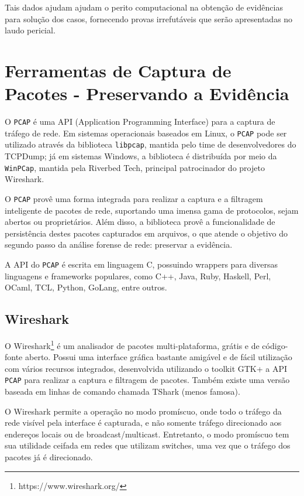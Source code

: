 \documentclass[12pt]{article}
\begin{document}
Tais dados ajudam ajudam o perito computacional na obtenção de evidências para solução dos casos, fornecendo provas irrefutáveis que serão apresentadas no laudo pericial.

\section{Ferramentas de Captura de Pacotes - Preservando a Evidência}

O \texttt{PCAP} é uma API (Application Programming Interface) para a captura de tráfego de rede. Em sistemas operacionais baseados em Linux, o \texttt{PCAP} pode ser utilizado através da biblioteca \texttt{libpcap}, mantida pelo time de desenvolvedores do TCPDump; já em sistemas Windows, a biblioteca é distribuída por meio da \texttt{WinPCap}, mantida pela Riverbed Tech, principal patrocinador do projeto Wireshark.

O \texttt{PCAP} provê uma forma integrada para realizar a captura e a filtragem inteligente de pacotes de rede, suportando uma imensa gama de protocolos, sejam abertos ou proprietários. Além disso, a biblioteca provê a funcionalidade de persistência destes pacotes capturados em arquivos, o que atende o objetivo do segundo passo da análise forense de rede: preservar a evidência.

A API do \texttt{PCAP} é escrita em linguagem C, possuindo wrappers para diversas linguagens e frameworks populares, como C++, Java, Ruby, Haskell, Perl, OCaml, TCL, Python, GoLang, entre outros.

\subsection{Wireshark}

O Wireshark\footnote{https://www.wireshark.org/} é um analisador de pacotes multi-plataforma, grátis e de código-fonte aberto. Possui uma interface gráfica bastante amigável e de fácil utilização com vários recursos integrados, desenvolvida utilizando o toolkit GTK+ a API \texttt{PCAP} para realizar a captura e filtragem de pacotes. Também existe uma versão baseada em linhas de comando chamada TShark (menos famosa).

O Wireshark permite a operação no modo promíscuo, onde todo o tráfego da rede visível pela interface é capturada, e não somente tráfego direcionado aos endereços locais ou de broadcast/multicast. Entretanto, o modo promíscuo tem sua utilidade ceifada em redes que utilizam switches, uma vez que o tráfego dos pacotes já é direcionado.
\end{document}
